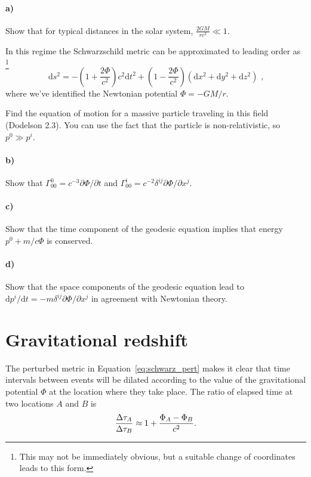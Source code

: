 \documentclass[12pt]{article}
\newcommand\diff{\mathrm{d}}
\begin{document}
\paragraph{a)} Show that for typical distances in the solar system, $\frac{2 G
M}{r c^2} \ll 1$.

In this regime the Schwarzschild metric can be approximated to leading order as
\footnote{This may not be immediately obvious, but a suitable change of coordinates leads to this form.}
\begin{equation}
    \diff s^2 = - \left(1 + \frac{2 \Phi}{c^2}\right) c^2 \diff t^2
    + \left(1 - \frac{2 \Phi}{c^2}\right)
    (\diff x^2 + \diff y^2 + \diff z^2) \text{ ,}
\label{eq:schwarz_pert}
\end{equation}
where we've identified the Newtonian potential $\Phi = -GM/r$.

Find the equation of motion for a massive particle traveling in this field
(Dodelson 2.3). You can use the fact that the particle is non-relativistic, so
$p^0 \gg p^i$.

\paragraph{b)} Show that $\Gamma^0_{00} = c^{-3} \partial \Phi / \partial t$ and
$\Gamma^i_{00} = c^{-2} \delta^{ij} \partial \Phi / \partial x^j$.

\paragraph{c)} Show that the time component of the geodesic equation implies
that energy $p^0 + m / c \Phi$ is conserved.

\paragraph{d)} Show that the space components of the geodesic equation lead to
$\diff p^i / \diff t = - m \delta^{ij} \partial \Phi / \partial x^j$ in
agreement with Newtonian theory.

\section{Gravitational redshift}

The perturbed metric in Equation~\ref{eq:schwarz_pert} makes it clear that time
intervals between events will be dilated according to the value of the
gravitational potential $\Phi$ at the location where they take place. The ratio
of elapsed time at two locations $A$ and $B$ is
\begin{equation}
    \frac{\Delta \tau_A}{\Delta \tau_B} \approx 1 + \frac{\Phi_A - \Phi_B}{c^2} \text.
\end{equation}
\end{document}
